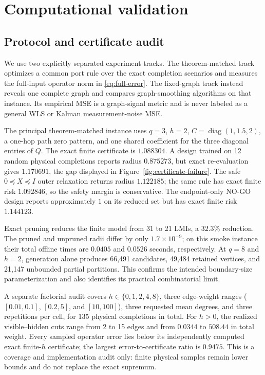 \documentclass[11pt]{article}
\theoremstyle{definition}
\theoremstyle{remark}
\newcommand{\diag}{\operatorname{diag}}
\begin{document}
\section{Computational validation}

\subsection{Protocol and certificate audit}

We use two explicitly separated experiment tracks.  The theorem-matched track
optimizes a common port rule over the exact completion scenarios and measures
the full-input operator norm in \eqref{eq:full-error}.  The fixed-graph track
instead reveals one complete graph and compares graph-smoothing algorithms on
that instance.  Its empirical MSE is a graph-signal metric and is never labeled
as a general WLS or Kalman measurement-noise MSE.

The principal theorem-matched instance uses $q=3$, $h=2$,
$C=\diag(1,1.5,2)$, a one-hop path zero pattern, and one shared coefficient for
the three diagonal entries of $Q$.  The exact finite certificate is
$1.088304$.  A design trained on 12 random physical completions reports radius
$0.875273$, but exact re-evaluation gives $1.170691$, the gap displayed in
Figure~\ref{fig:certificate-failure}.  The safe
$0\preceq X\preceq I$ outer relaxation returns radius $1.122185$; the same
rule has exact finite risk $1.092846$, so the safety margin is conservative.
The endpoint-only NO-GO design reports approximately $1$ on its reduced set
but has exact finite risk $1.144123$.

Exact pruning reduces the finite model from 31 to 21 LMIs, a $32.3\%$
reduction.  The pruned and unpruned radii differ by only
$1.7\times10^{-9}$; on this smoke instance their total offline times are
$0.0405$ and $0.0526$ seconds, respectively.  At $q=8$ and $h=2$, generation
alone produces 66,491 candidates, 49,484 retained vertices, and 21,147
unbounded partial partitions.  This confirms the intended boundary-size
parameterization and also identifies its practical combinatorial limit.

A separate factorial audit covers $h\in\{0,1,2,4,8\}$, three edge-weight
ranges ($[0.01,0.1]$, $[0.2,5]$, and $[10,100]$), three requested mean
degrees, and three repetitions per cell, for 135 physical completions in
total.  For $h>0$, the realized visible--hidden cuts range from 2 to 15 edges
and from $0.0344$ to $508.44$ in total weight.  Every sampled operator error
lies below its independently computed exact finite-$h$ certificate; the
largest error-to-certificate ratio is $0.9475$.  This is a coverage and
implementation audit only: finite physical samples remain lower bounds and do
not replace the exact supremum.
\end{document}
